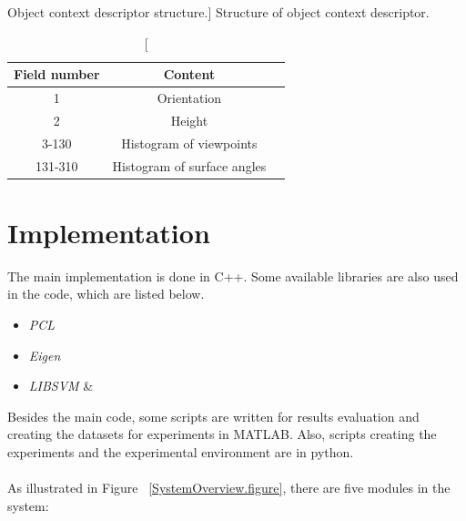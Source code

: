 \begin{table}
\centering
\caption
[Object context descriptor structure.]
{Structure of object context descriptor.}
\label{Descriptor.table}
\begin{tabular}{|c|c|c|}
\hline
Field number & Content\\

\hline

1 & Orientation\\

\hline

2 & Height\\

\hline

3-130 & Histogram of viewpoints \\

\hline

131-310 &  Histogram of surface angles\\

\hline

\end{tabular}
\end{table}

% 
% 


\section{Implementation}

The main implementation is done in C++. Some available libraries are also used in the code, which are listed below.      

\begin{itemize}
 \item {\it PCL} \cite{Rusu_ICRA2011_PCL}
 \item {\it Eigen} \cite{eigenweb}
 \item {\it LIBSVM} \cite{LIBSVM} \& \cite{li2010holistic}
\end{itemize}

Besides the main code, some scripts are written for results evaluation and creating the datasets for experiments in MATLAB. Also, 
scripts creating the experiments and the experimental environment are in python.\\
\\
As illustrated in Figure ~\ref{SystemOverview.figure}, there are five modules in the system:

